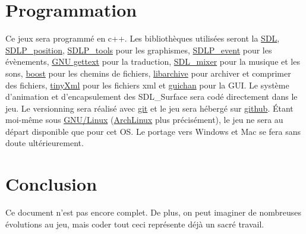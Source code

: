\documentclass{article}
\begin{document}
\section{Programmation}
Ce jeux sera programmé en c++. Les bibliothèques utilisées seront la \href{http://www.libsdl.org/}{SDL}, \href{https://github.com/lucas8/SDLP\_position}{SDLP\_position}, \href{https://github.com/lucas8/SDLP\_tools}{SDLP\_tools} pour les graphismes, 
\href{https://github.com/lucas8/SDLP\_event}{SDLP\_event} pour les évènements, 
\href{http://www.gnu.org/software/gettext/}{GNU gettext} pour la traduction, 
\href{http://www.libsdl.org/projects/SDL\_mixer/}{SDL\_mixer} pour la musique et les sons, 
\href{http://www.boost.org/}{boost} pour les chemins de fichiers, 
\href{https://github.com/libarchive/libarchive}{libarchive} pour archiver et comprimer des fichiers, 
\href{http://www.grinninglizard.com/tinyxml/index.html}{tinyXml} pour les fichiers xml 
et \href{http://guichan.sourceforge.net/wiki/index.php/Main\_Page}{guichan} pour la GUI. Le système d'animation et d'encapsulement des SDL\_Surface sera codé directement dans le jeu. Le versionning sera réalisé avec \href{http://git-scm.com/}{git} et le jeu sera hébergé sur \href{https://github.com/}{github}. Étant moi-même sous \href{https://fr.wikipedia.org/wiki/Linux}{GNU/Linux} (\href{http://www.archlinux.org/}{ArchLinux} plus précisément), le jeu ne sera au départ disponible que pour cet OS. Le portage vers Windows et Mac se fera sans doute ultérieurement.

\section{Conclusion}
Ce document n'est pas encore complet. De plus, on peut imaginer de nombreuses évolutions au jeu, mais coder tout ceci représente déjà un sacré travail.
\end{document}
